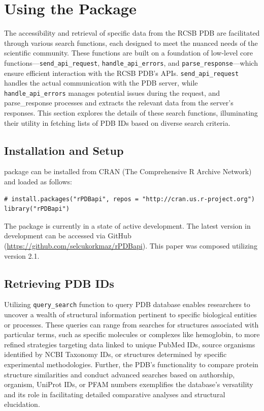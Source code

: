 \section{Using the Package}\label{using-the-package}

The accessibility and retrieval of specific data from the RCSB PDB are facilitated through various search functions, each designed to meet the nuanced needs of the scientific community. These functions are built on a foundation of low-level core functions---\texttt{send\_api\_request}, \texttt{handle\_api\_errors}, and \texttt{parse\_response}---which ensure efficient interaction with the RCSB PDB's APIs. \texttt{send\_api\_request} handles the actual communication with the PDB server, while \texttt{handle\_api\_errors} manages potential issues during the request, and parse\_response processes and extracts the relevant data from the server's responses. This section explores the details of these search functions, illuminating their utility in fetching lists of PDB IDs based on diverse search criteria.

\subsection{Installation and Setup}\label{installation-and-setup}

 package can be installed from CRAN (The Comprehensive R Archive Network) and loaded as follows:

\begin{verbatim}
# install.packages("rPDBapi", repos = "http://cran.us.r-project.org")
library("rPDBapi")
\end{verbatim}

The package is currently in a state of active development. The latest version in development can be accessed via GitHub (\url{https://github.com/selcukorkmaz/rPDBapi}). This paper was composed utilizing  version 2.1.

\subsection{Retrieving PDB IDs}\label{retrieving-pdb-ids}

Utilizing \texttt{query\_search} function to query PDB database enables researchers to uncover a wealth of structural information pertinent to specific biological entities or processes. These queries can range from searches for structures associated with particular terms, such as specific molecules or complexes like hemoglobin, to more refined strategies targeting data linked to unique PubMed IDs, source organisms identified by NCBI Taxonomy IDs, or structures determined by specific experimental methodologies. Further, the PDB's functionality to compare protein structure similarities and conduct advanced searches based on authorship, organism, UniProt IDs, or PFAM numbers exemplifies the database's versatility and its role in facilitating detailed comparative analyses and structural elucidation.

